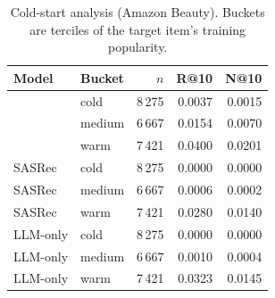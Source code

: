 \begin{table}[t]
\centering
\caption{Cold-start analysis (Amazon Beauty). Buckets are terciles of the target item's training popularity.}
\label{tab:coldstart}
\small
\begin{tabular}{llrrr}
\toprule
Model & Bucket & $n$ & R@10 & N@10 \\
\midrule
\model{} & cold & 8\,275 & 0.0037 & 0.0015 \\
\model{} & medium & 6\,667 & 0.0154 & 0.0070 \\
\model{} & warm & 7\,421 & 0.0400 & 0.0201 \\
\midrule
SASRec & cold & 8\,275 & 0.0000 & 0.0000 \\
SASRec & medium & 6\,667 & 0.0006 & 0.0002 \\
SASRec & warm & 7\,421 & 0.0280 & 0.0140 \\
\midrule
LLM-only & cold & 8\,275 & 0.0000 & 0.0000 \\
LLM-only & medium & 6\,667 & 0.0010 & 0.0004 \\
LLM-only & warm & 7\,421 & 0.0323 & 0.0145 \\
\bottomrule
\end{tabular}
\end{table}

